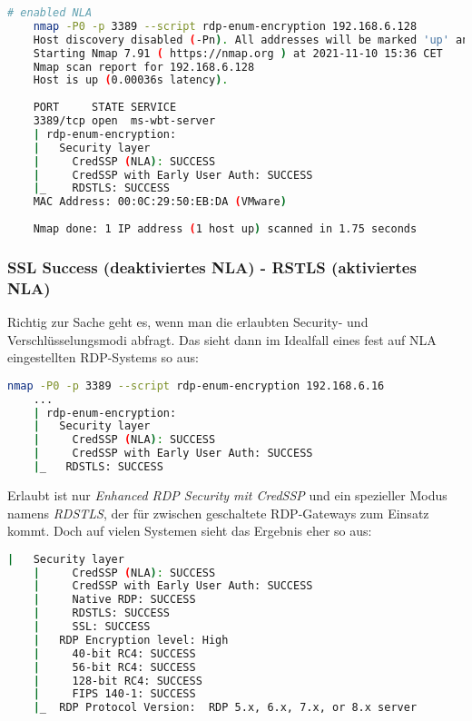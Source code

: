 \begin{lstlisting}[language=bash]
    # enabled NLA
    nmap -P0 -p 3389 --script rdp-enum-encryption 192.168.6.128
    Host discovery disabled (-Pn). All addresses will be marked 'up' and scan times will be slower.
    Starting Nmap 7.91 ( https://nmap.org ) at 2021-11-10 15:36 CET
    Nmap scan report for 192.168.6.128
    Host is up (0.00036s latency).
    
    PORT     STATE SERVICE
    3389/tcp open  ms-wbt-server
    | rdp-enum-encryption:
    |   Security layer
    |     CredSSP (NLA): SUCCESS
    |     CredSSP with Early User Auth: SUCCESS
    |_    RDSTLS: SUCCESS
    MAC Address: 00:0C:29:50:EB:DA (VMware)
    
    Nmap done: 1 IP address (1 host up) scanned in 1.75 seconds
\end{lstlisting}

\subsubsection{SSL Success (deaktiviertes NLA) - RSTLS (aktiviertes NLA)}

Richtig zur Sache geht es, wenn man die erlaubten Security- und Verschlüsselungsmodi abfragt. Das sieht dann im Idealfall eines fest auf NLA eingestellten RDP-Systems so aus:

\begin{lstlisting}[language=bash]
    nmap -P0 -p 3389 --script rdp-enum-encryption 192.168.6.16
    ...
    | rdp-enum-encryption:
    |   Security layer
    |     CredSSP (NLA): SUCCESS
    |     CredSSP with Early User Auth: SUCCESS
    |_   RDSTLS: SUCCESS
\end{lstlisting}

Erlaubt ist nur \textit{Enhanced RDP Security mit CredSSP} und ein spezieller Modus namens \textit{RDSTLS}, der für zwischen geschaltete RDP-Gateways zum Einsatz kommt. Doch auf vielen Systemen sieht das Ergebnis eher so aus:

\begin{lstlisting}[language=bash]
    |   Security layer
    |     CredSSP (NLA): SUCCESS
    |     CredSSP with Early User Auth: SUCCESS
    |     Native RDP: SUCCESS
    |     RDSTLS: SUCCESS
    |     SSL: SUCCESS
    |   RDP Encryption level: High
    |     40-bit RC4: SUCCESS
    |     56-bit RC4: SUCCESS
    |     128-bit RC4: SUCCESS
    |     FIPS 140-1: SUCCESS
    |_  RDP Protocol Version:  RDP 5.x, 6.x, 7.x, or 8.x server
\end{lstlisting}

